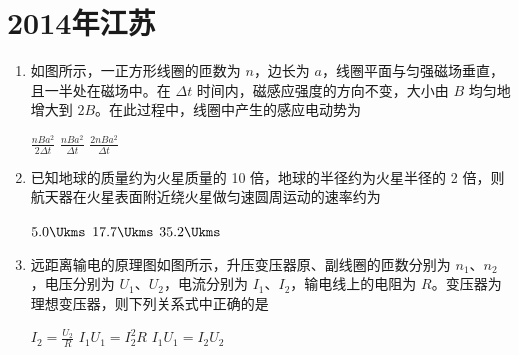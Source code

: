 \documentclass[\gkver]{gaokaozhenti}
\begin{document}
\chapter{2014年江苏}

\begin{enumerate}
\item
如图所示，一正方形线圈的匝数为 $n$，边长为 $a$，线圈平面与匀强磁场垂直，且一半处在磁场中。在 $\Delta t$ 时间内，磁感应强度的方向不变，大小由 $B$ 均匀地增大到 $2B$。在此过程中，线圈中产生的感应电动势为


{$\frac{nBa^{2}}{2\Delta t}$}
{$\frac{nBa^{2}}{\Delta t}$}
{$\frac{2nBa^{2}}{\Delta t}$}


\item
已知地球的质量约为火星质量的 10 倍，地球的半径约为火星半径的 2 倍，则航天器在火星表面附近绕火星做匀速圆周运动的速率约为

\fourchoices[answer=A]
{$3.5\Ukms$}
{$5.0\Ukms$}
{$17.7\Ukms$}
{$35.2\Ukms$}


\item
远距离输电的原理图如图所示，升压变压器原、副线圈的匝数分别为 $n_{1}$、$n_{2}$，电压分别为 $U_{1}$、$U_{2}$，电流分别为 $I_{1}$、$I_{2}$，输电线上的电阻为 $R$。变压器为理想变压器，则下列关系式中正确的是


{$I_{2}=\frac{U_{2}}{R}$}
{$I_{1}U_{1}=I_{2}^{2}R$}
{$I_{1}U_{1}=I_{2}U_{2}$}



\end{enumerate}
\end{document}
